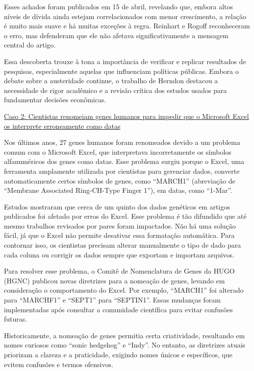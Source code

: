 \documentclass[
  a4paper,
]{article}
\begin{document}
\begin{tcolorbox}
Esses achados foram publicados em 15 de abril, revelando que, embora
altos níveis de dívida ainda estejam correlacionados com menor
crescimento, a relação é muito mais suave e há muitas exceções à regra.
Reinhart e Rogoff reconheceram o erro, mas defenderam que ele não
afetava significativamente a mensagem central do artigo.

Essa descoberta trouxe à tona a importância de verificar e replicar
resultados de pesquisas, especialmente aquelas que influenciam políticas
públicas. Embora o debate sobre a austeridade continue, o trabalho de
Herndon destacou a necessidade de rigor acadêmico e a revisão crítica
dos estudos usados para fundamentar decisões econômicas.

\href{https://www.theverge.com/2020/8/6/21355674/human-genes-rename-microsoft-excel-misreading-dates}{Caso
2: Cientistas renomeiam genes humanos para impedir que o Microsoft Excel
os interprete erroneamente como datas}

Nos últimos anos, 27 genes humanos foram renomeados devido a um problema
comum com o Microsoft Excel, que interpretava incorretamente os símbolos
alfanuméricos dos genes como datas. Esse problema surgiu porque o Excel,
uma ferramenta amplamente utilizada por cientistas para gerenciar dados,
converte automaticamente certos símbolos de genes, como ``MARCH1''
(abreviação de ``Membrane Associated Ring-CH-Type Finger 1''), em datas,
como ``1-Mar''.

Estudos mostraram que cerca de um quinto dos dados genéticos em artigos
publicados foi afetado por erros do Excel. Esse problema é tão difundido
que até mesmo trabalhos revisados por pares foram impactados. Não há uma
solução fácil, já que o Excel não permite desativar essa formatação
automática. Para contornar isso, os cientistas precisam alterar
manualmente o tipo de dado para cada coluna ou corrigir os dados sempre
que exportam e importam arquivos.

Para resolver esse problema, o Comitê de Nomenclatura de Genes da HUGO
(HGNC) publicou novas diretrizes para a nomeação de genes, levando em
consideração o comportamento do Excel. Por exemplo, ``MARCH1'' foi
alterado para ``MARCHF1'' e ``SEPT1'' para ``SEPTIN1''. Essas mudanças
foram implementadas após consultar a comunidade científica para evitar
confusões futuras.

Historicamente, a nomeação de genes permitia certa criatividade,
resultando em nomes curiosos como ``sonic hedgehog'' e ``Indy''. No
entanto, as diretrizes atuais priorizam a clareza e a praticidade,
exigindo nomes únicos e específicos, que evitem confusões e termos
ofensivos.


\end{tcolorbox}
\end{document}
